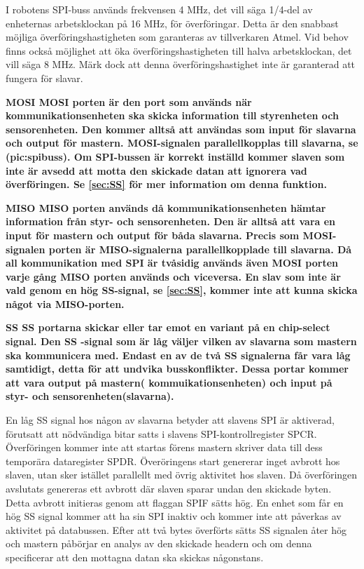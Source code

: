 I robotens SPI-buss används frekvensen 4 MHz, det vill säga 1/4-del av 
enheternas arbetsklockan på 16 MHz, för överföringar. Detta är den snabbast 
möjliga överföringshastigheten som garanteras av tillverkaren Atmel. Vid 
behov finns också möjlighet att öka överföringshastigheten till halva 
arbetsklockan, det vill säga 8 MHz. Märk dock att denna överföringshastighet 
inte är garanterad att fungera för slavar.


\bf{MOSI}
MOSI porten är den port som används när kommunikationsenheten ska skicka 
information till styrenheten och sensorenheten. Den kommer alltså att 
användas som input för slavarna och output för mastern. MOSI-signalen 
parallellkopplas till slavarna, se \fig(pic:spibuss). Om SPI-bussen är 
korrekt inställd kommer slaven som inte är avsedd att motta den skickade 
datan att ignorera vad överföringen. Se \ref{sec:SS} för mer information om 
denna funktion.

\bf{MISO}
MISO porten används då kommunikationsenheten hämtar information från styr- 
och sensorenheten. Den är alltså att vara en input för mastern och output för 
båda slavarna. Precis som MOSI-signalen porten är MISO-signalerna 
parallellkopplade till slavarna.  Då all kommunikation med SPI är tvåsidig 
används även MOSI porten varje gång MISO porten används och viceversa. En 
slav som inte är vald genom en hög SS-signal, se \ref{sec:SS}, kommer inte 
att kunna skicka något via MISO-porten. 

\bf{SS}
\label{sec:SS}
SS portarna skickar eller tar emot en variant på en chip-select signal. Den SS
-signal som är låg väljer vilken av slavarna som mastern ska kommunicera med. 
Endast en av de två SS signalerna får vara låg samtidigt, detta för att 
undvika busskonflikter. Dessa portar kommer att vara output på mastern(
kommuikationsenheten) och input på styr- och sensorenheten(slavarna).

En låg SS signal hos någon av slavarna betyder att slavens SPI är aktiverad, 
förutsatt att nödvändiga bitar satts i slavens SPI-kontrollregister 
SPCR. Överföringen kommer inte att startas förens mastern skriver data till 
dess temporära dataregister SPDR. Överöringens start genererar inget avbrott 
hos slaven, utan sker istället parallellt med övrig aktivitet hos slaven. Då 
överföringen avslutats genereras ett avbrott där slaven sparar undan den 
skickade byten. Detta avbrott initieras genom att flaggan SPIF sätts hög. En 
enhet som får en hög SS signal kommer att ha sin SPI inaktiv och kommer inte 
att påverkas av aktivitet på databussen. Efter att två bytes överförts sätts 
SS signalen åter hög och mastern påbörjar en analys av den skickade headern 
och om denna specificerar att den mottagna datan ska skickas någonstans.


